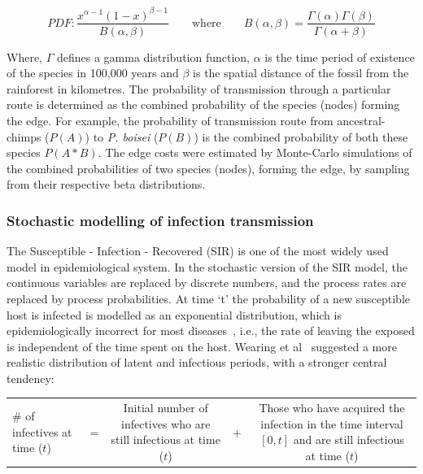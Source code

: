 \documentclass[fleqn,10pt]{wlscirep}
\begin{document}
\begin{equation}
PDF: \frac{x^{\alpha - 1}(1 - x)^{\beta - 1}}{B(\alpha, \beta)} \qquad \mathrm{where} \qquad B(\alpha, \beta) = \frac{\Gamma(\alpha)\Gamma(\beta)}{\Gamma(\alpha + \beta)}
\end{equation}

Where, $\Gamma$ defines a gamma distribution function, $\alpha$ is the time period of existence of the species in 100,000 years and $\beta$ is the spatial distance of the fossil from the rainforest in kilometres. The probability of transmission through a particular route is determined as the combined probability of the species (nodes) forming the edge. For example, the probability of transmission route from ancestral-chimps ($P(A)$) to \textit{P. boisei} ($P(B)$) is the combined probability of both these species $P(A*B)$. The edge costs were estimated by Monte-Carlo simulations of the combined probabilities of two species (nodes), forming the edge, by sampling from their respective beta distributions.
 

\subsubsection*{Stochastic modelling of infection transmission}
The Susceptible - Infection - Recovered (SIR) is one of the most widely used model in epidemiological system. In the stochastic version of the SIR model, the continuous variables are replaced by discrete numbers, and the process rates are replaced by process probabilities. At time `t' the probability of a new susceptible host is infected is modelled as an exponential distribution, which is epidemiologically incorrect for most diseases~\cite{Wearing2005,Bailey1975,sartwell1950distribution}, i.e., the rate of leaving the exposed is independent of the time spent on the host. Wearing et al~\cite{Wearing2005} suggested a more realistic distribution of latent and infectious periods, with a stronger central tendency:

\begin{table}[!h]
	\centering
	\renewcommand{\arraystretch}{1.5}
	\begin{tabulary}{\linewidth}{LCCCC}
		\# of infectives at time ($t$) & =  & 
		Initial number of infectives who are still infectious at time ($t$) & + & 
		Those who have acquired the infection in the time interval $[0, t]$ and are still infectious at time ($t$)			\\ 
	\end{tabulary}
\end{table}
\end{document}
